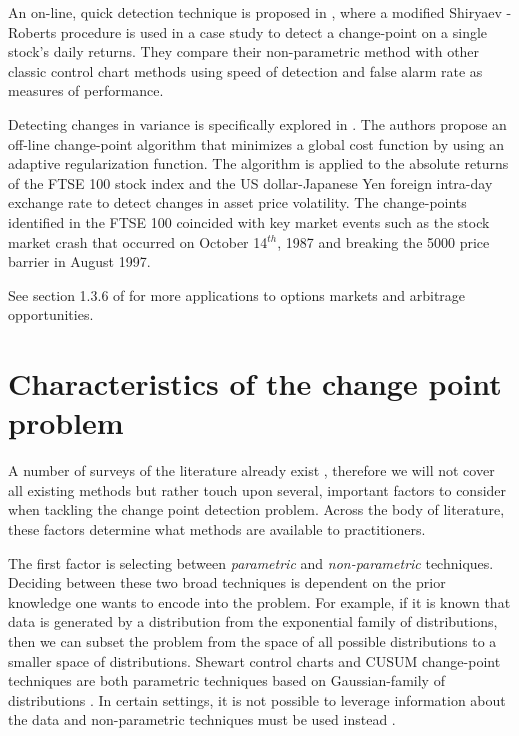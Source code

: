 An on-line, quick detection technique is proposed in  \cite{pepelyshev2015real}, where a modified Shiryaev - Roberts procedure is used in a case study to detect a change-point on a single stock's daily returns. They compare their non-parametric method with other classic control chart methods using speed of detection and false alarm rate as measures of performance.

Detecting changes in variance is specifically explored in  \cite{lavielle2007adaptive}. The authors propose an off-line change-point algorithm that minimizes a global cost function by using an adaptive regularization function. The algorithm is applied to the absolute returns of the FTSE 100 stock index and the US dollar-Japanese Yen foreign intra-day exchange rate to detect changes in asset price volatility. The change-points  identified in the FTSE 100 coincided with key market events such as the stock market crash that occurred on October 14$^{th}$, 1987 and breaking the 5000 price barrier in August 1997.

See section 1.3.6 of \cite{tartakovsky2014sequential} for more applications to options markets and arbitrage opportunities.

\section{Characteristics of the change point problem}
A number of surveys of the literature already exist \cite{aminikhanghahi2017survey} \cite{niu2016multiple}, therefore we will not cover all existing methods but rather touch upon several, important factors to consider when tackling the change point detection problem. Across the body of literature, these factors determine what methods are available to practitioners. %

The first factor is selecting between \textit{parametric} and \textit{non-parametric} techniques. Deciding between these two broad techniques is dependent on the prior knowledge one wants to encode into the problem. For example, if it is known that data is generated by a distribution from the exponential family of distributions, then we can subset the problem from the space of all possible distributions to a smaller space of distributions. Shewart control charts and CUSUM change-point techniques are both parametric techniques based on Gaussian-family of distributions \cite{page1954continuous} \cite{chen2011parametric}. In certain settings, it is not possible to leverage information about the data and non-parametric techniques must be used instead \cite{brodsky2013nonparametric}.

